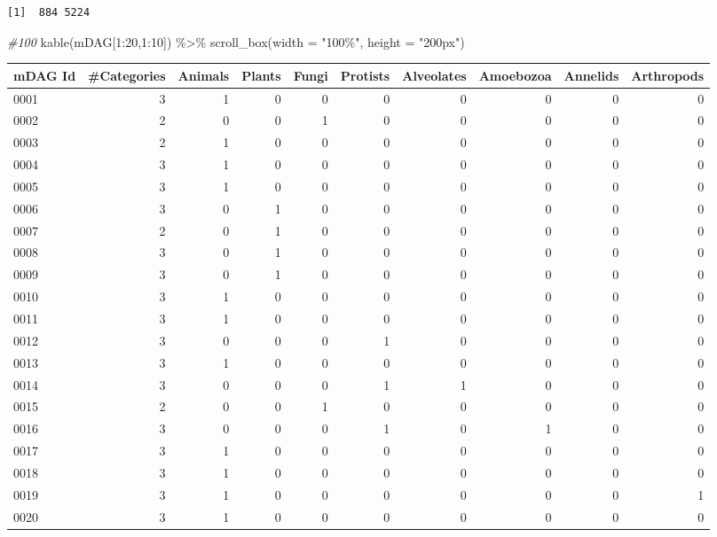 \documentclass[
  letterpaper,
  DIV=11,
  numbers=noendperiod]{scrreprt}
\newenvironment{Shaded}{}{}
\newcommand{\AttributeTok}[1]{\textcolor[rgb]{0.78,0.47,0.87}{#1}}
\newcommand{\CommentTok}[1]{\textcolor[rgb]{0.36,0.39,0.44}{\textit{#1}}}
\newcommand{\DecValTok}[1]{\textcolor[rgb]{0.82,0.60,0.40}{#1}}
\newcommand{\FunctionTok}[1]{\textcolor[rgb]{0.38,0.69,0.94}{#1}}
\newcommand{\NormalTok}[1]{\textcolor[rgb]{0.67,0.70,0.75}{#1}}
\newcommand{\SpecialCharTok}[1]{\textcolor[rgb]{0.34,0.71,0.76}{#1}}
\newcommand{\StringTok}[1]{\textcolor[rgb]{0.60,0.76,0.47}{#1}}
\begin{document}
\begin{verbatim}
[1]  884 5224
\end{verbatim}

\begin{Shaded}
\begin{Highlighting}[]
\CommentTok{\#100}
\FunctionTok{kable}\NormalTok{(mDAG[}\DecValTok{1}\SpecialCharTok{:}\DecValTok{20}\NormalTok{,}\DecValTok{1}\SpecialCharTok{:}\DecValTok{10}\NormalTok{]) }\SpecialCharTok{\%\textgreater{}\%}   \FunctionTok{scroll\_box}\NormalTok{(}\AttributeTok{width =} \StringTok{"100\%"}\NormalTok{, }\AttributeTok{height =} \StringTok{"200px"}\NormalTok{)}
\end{Highlighting}
\end{Shaded}

\begin{tabular}{l|r|r|r|r|r|r|r|r|r}
\hline
mDAG Id & \#Categories & Animals & Plants & Fungi & Protists & Alveolates & Amoebozoa & Annelids & Arthropods\\
\hline
0001 & 3 & 1 & 0 & 0 & 0 & 0 & 0 & 0 & 0\\
\hline
0002 & 2 & 0 & 0 & 1 & 0 & 0 & 0 & 0 & 0\\
\hline
0003 & 2 & 1 & 0 & 0 & 0 & 0 & 0 & 0 & 0\\
\hline
0004 & 3 & 1 & 0 & 0 & 0 & 0 & 0 & 0 & 0\\
\hline
0005 & 3 & 1 & 0 & 0 & 0 & 0 & 0 & 0 & 0\\
\hline
0006 & 3 & 0 & 1 & 0 & 0 & 0 & 0 & 0 & 0\\
\hline
0007 & 2 & 0 & 1 & 0 & 0 & 0 & 0 & 0 & 0\\
\hline
0008 & 3 & 0 & 1 & 0 & 0 & 0 & 0 & 0 & 0\\
\hline
0009 & 3 & 0 & 1 & 0 & 0 & 0 & 0 & 0 & 0\\
\hline
0010 & 3 & 1 & 0 & 0 & 0 & 0 & 0 & 0 & 0\\
\hline
0011 & 3 & 1 & 0 & 0 & 0 & 0 & 0 & 0 & 0\\
\hline
0012 & 3 & 0 & 0 & 0 & 1 & 0 & 0 & 0 & 0\\
\hline
0013 & 3 & 1 & 0 & 0 & 0 & 0 & 0 & 0 & 0\\
\hline
0014 & 3 & 0 & 0 & 0 & 1 & 1 & 0 & 0 & 0\\
\hline
0015 & 2 & 0 & 0 & 1 & 0 & 0 & 0 & 0 & 0\\
\hline
0016 & 3 & 0 & 0 & 0 & 1 & 0 & 1 & 0 & 0\\
\hline
0017 & 3 & 1 & 0 & 0 & 0 & 0 & 0 & 0 & 0\\
\hline
0018 & 3 & 1 & 0 & 0 & 0 & 0 & 0 & 0 & 0\\
\hline
0019 & 3 & 1 & 0 & 0 & 0 & 0 & 0 & 0 & 1\\
\hline
0020 & 3 & 1 & 0 & 0 & 0 & 0 & 0 & 0 & 0\\
\hline
\end{tabular}
\end{document}
